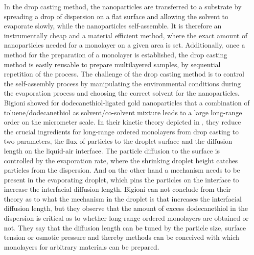 \documentclass[\main/dresen_thesis.tex]{subfiles}
\begin{document}
  In the drop casting method, the nanoparticles are transferred to a substrate by spreading a drop of dispersion on a flat surface and allowing the solvent to evaporate slowly, while the nanoparticles self-assemble.
  It is therefore an instrumentally cheap and a material efficient method, where the exact amount of nanoparticles needed for a monolayer on a given area is set.
  Additionally, once a method for the preparation of a monolayer is established, the drop casting method is easily reusable to prepare multilayered samples, by sequential repetition of the process.
  The challenge of the drop casting method is to control the self-assembly process by manipulating the environmental conditions during the evaporation process and choosing the correct solvent for the nanoparticles.
  Bigioni \etal \cite{Bigioni_2006_Kinet} showed for dodecanethiol-ligated gold nanoparticles that a combination of toluene/dodecanethiol as solvent/co-solvent mixture leads to a large long-range order on the micrometer scale.
  In their kinetic theory depicted in , they reduce the crucial ingredients for long-range ordered monolayers from drop casting to two parameters, the flux of particles to the droplet surface and the diffusion length on the liquid-air interface.
  The particle diffusion to the surface is controlled by the evaporation rate, where the shrinking droplet height catches particles from the dispersion.
  And on the other hand a mechanism needs to be present in the evaporating droplet, which pins the particles on the interface to increase the interfacial diffusion length.
  Bigioni \etal \cite{Bigioni_2006_Kinet} can not conclude from their theory as to what the mechanism in the droplet is that increases the interfacial diffusion length, but they observe that the amount of excess dodecanethiol in the dispersion is critical as to whether long-range ordered monolayers are obtained or not.
  They say that the diffusion length can be tuned by the particle size, surface tension or osmotic pressure and thereby methods can be conceived with which monolayers for arbitrary materials can be prepared.
\end{document}
